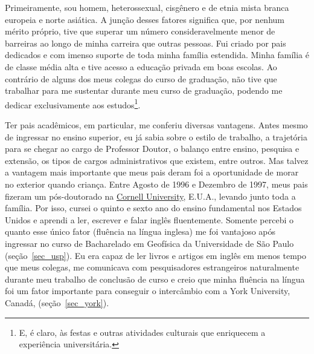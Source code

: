 \documentclass[10pt,a4paper,oneside]{book}
\begin{document}
Primeiramente, sou homem, heterossexual, cisgênero e de etnia mista branca
europeia e norte asiática.
A junção desses fatores significa que, por nenhum mérito próprio, tive que
superar um número consideravelmente menor de barreiras ao longo de minha
carreira que outras pessoas.
Fui criado por pais dedicados e com imenso suporte de toda minha família
estendida.
Minha família é de classe média alta e tive acesso a educação privada em boas
escolas.
Ao contrário de alguns dos meus colegas do curso de graduação, não tive que
trabalhar para me sustentar durante meu curso de graduação, podendo me dedicar
exclusivamente aos estudos\footnote{E, é claro, às festas e outras atividades
culturais que enriquecem a experiência universitária.}.

Ter pais acadêmicos, em particular, me conferiu diversas vantagens.
Antes mesmo de ingressar no ensino superior, eu já sabia sobre o estilo de
trabalho, a trajetória para se chegar ao cargo de Professor Doutor, o balanço
entre ensino, pesquisa e extensão, os tipos de cargos administrativos que
existem, entre outros.
Mas talvez a vantagem mais importante que meus pais deram foi a oportunidade
de morar no exterior quando criança.
Entre Agosto de 1996 e Dezembro de 1997, meus pais fizeram um pós-doutorado
na \href{https://www.cornell.edu/}{Cornell University}, E.U.A., levando junto
toda a família.
Por isso, cursei o quinto e sexto ano do ensino fundamental nos Estados Unidos
e aprendi a ler, escrever e falar inglês fluentemente.
Somente percebi o quanto esse único fator (fluência na língua inglesa) me foi
vantajoso após ingressar no curso de Bacharelado em Geofísica da Universidade
de São Paulo (seção~\ref{sec_usp}).
Eu era capaz de ler livros e artigos em inglês em menos tempo que meus colegas,
me comunicava com pesquisadores estrangeiros naturalmente durante meu trabalho
de conclusão de curso e creio que minha fluência na língua foi um fator
importante para conseguir o intercâmbio com a York University, Canadá,
(seção~\ref{sec_york}).
\end{document}

